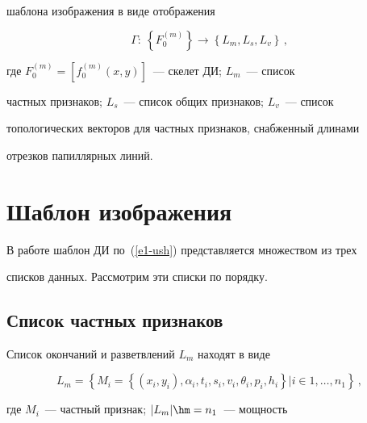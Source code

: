 шаблона изображения в виде отображения


  \begin{equation}


  \Gamma:\ \left\{ F_0^{(m)}\right\}\rightarrow \left\{ L_m, L_s, L_v\right\}\,,


  \label{e1-ush}


  \end{equation}


где $F_0^{(m)}=\left[ f_0^{(m)}(x,y)\right]$~--- скелет ДИ; $L_m$~---   список 


частных признаков; $L_s$~---   список общих признаков; $L_v$~---  список 


топологических векторов для частных признаков, снабженный длинами 


отрезков папиллярных линий.





\section{Шаблон изображения}





  В работе шаблон ДИ по~(\ref{e1-ush}) представляется множеством из трех 


списков данных. Рассмотрим эти списки по порядку.


  





\subsection{Список частных признаков} %





  Список окончаний и разветвлений $L_m$ находят в виде


  \begin{equation}


  L_m=\left\{ M_i=\left\{ (x_i,y_i),\alpha_i,t_i,s_i,v_i,\theta_i,p_i,h_i\right\}\vert 


i\in 1,\ldots ,n_1\right\}\,,


  \label{e2-ush}


  \end{equation}


где $M_i$~--- частный признак; $\vert L_m\vert \hm= n_1$~---  мощность 


